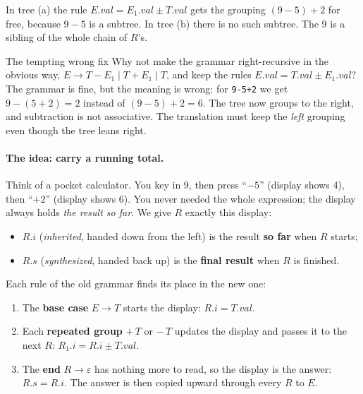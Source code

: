 \documentclass[11pt,a4paper]{article}
\begin{document}
In tree (a) the rule $E.val=E_1.val\pm T.val$ gets the grouping $(9-5)+2$ for free, because $9-5$ is a subtree. In tree (b) there is no such subtree. The 9 is a sibling of the whole chain of $R$'s.

\begin{pitfallbox}{The tempting wrong fix}
Why not make the grammar right-recursive in the obvious way, $E\to T-E_1\mid T+E_1\mid T$, and keep the rules $E.val=T.val\pm E_1.val$? The grammar is fine, but the meaning is wrong: for \texttt{9-5+2} we get $9-(5+2)=2$ instead of $(9-5)+2=6$. The tree now groups to the right, and subtraction is not associative. The translation must keep the \emph{left} grouping even though the tree leans right.
\end{pitfallbox}

\paragraph{The idea: carry a running total.} Think of a pocket calculator. You key in 9, then press ``$-5$'' (display shows 4), then ``$+2$'' (display shows 6). You never needed the whole expression; the display always holds \emph{the result so far}. We give $R$ exactly this display:
\begin{itemize}[nosep]
\item $R.i$ (\emph{inherited}, handed down from the left) is the result \textbf{so far} when $R$ starts;
\item $R.s$ (\emph{synthesized}, handed back up) is the \textbf{final result} when $R$ is finished.
\end{itemize}
Each rule of the old grammar finds its place in the new one:
\begin{enumerate}[nosep]
\item The \textbf{base case} $E\to T$ starts the display: $R.i=T.val$.
\item Each \textbf{repeated group} $+\,T$ or $-\,T$ updates the display and passes it to the next $R$: $R_1.i=R.i\pm T.val$.
\item The \textbf{end} $R\to\varepsilon$ has nothing more to read, so the display is the answer: $R.s=R.i$. The answer is then copied upward through every $R$ to $E$.
\end{enumerate}

\providecommand{\cfx}[1]{\textcolor{blue!70!black}{#1}}
\providecommand{\cgy}[1]{\textcolor{red!70!black}{#1}}
\end{document}
